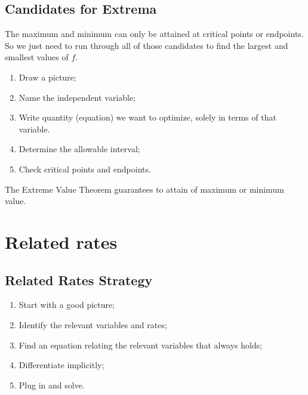 \subsection{Candidates for Extrema}

The maximum and minimum can only be attained at critical points or endpoints. So we just need to run through all of those candidates to find the largest and smallest values of $f$.
\begin{note}\leavevmode
  \begin{enumerate}
  \item Draw a picture;
  \item Name the independent variable;
  \item Write quantity (equation) we want to optimize, solely in terms of that variable.
  \item Determine the allowable interval;
  \item Check critical points and endpoints.
  \end{enumerate}
\end{note}
\begin{note}
The Extreme Value Theorem guarantees to attain of maximum or minimum value.
\end{note}

\section{Related rates}
\subsection{Related Rates Strategy}
\begin{enumerate}
\item Start with a good picture;
\item Identify the relevant variables and rates;
\item Find an equation relating the relevant variables that always holds;
\item Differentiate implicitly;
\item Plug in and solve.
\end{enumerate}
